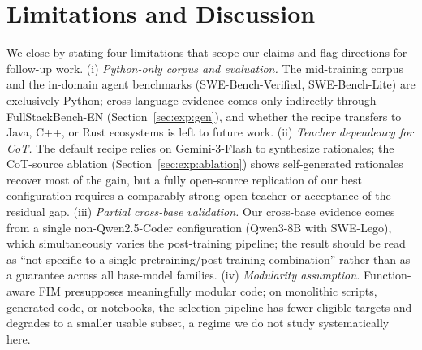 \section{Limitations and Discussion}
\vspace{-0.5ex}
\label{sec:limitations}

We close by stating four limitations that scope our claims and flag
directions for follow-up work.
(i) \textit{Python-only corpus and evaluation.} The mid-training corpus
and the in-domain agent benchmarks (SWE-Bench-Verified, SWE-Bench-Lite)
are exclusively Python; cross-language evidence comes only indirectly
through FullStackBench-EN (Section~\ref{sec:exp:gen}), and whether the
recipe transfers to Java, C++, or Rust ecosystems is left to future work.
(ii) \textit{Teacher dependency for CoT.} The default recipe relies on
Gemini-3-Flash to synthesize rationales; the CoT-source ablation
(Section~\ref{sec:exp:ablation}) shows self-generated rationales recover
most of the gain, but a fully open-source replication of our best
configuration requires a comparably strong open teacher or acceptance of
the residual gap.
(iii) \textit{Partial cross-base validation.} Our cross-base evidence
comes from a single non-Qwen2.5-Coder configuration (Qwen3-8B with
SWE-Lego), which simultaneously varies the post-training pipeline; the
result should be read as ``not specific to a single
pretraining/post-training combination'' rather than as a guarantee across
all base-model families.
(iv) \textit{Modularity assumption.} Function-aware FIM presupposes
meaningfully modular code; on monolithic scripts, generated code, or
notebooks, the selection pipeline has fewer eligible targets and degrades
to a smaller usable subset, a regime we do not study systematically here.
